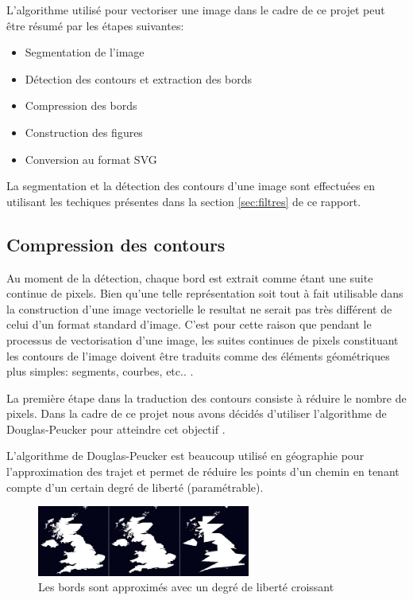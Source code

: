 \documentclass[twoside,openright,a4paper,11pt,french]{article}
\begin{document}
L'algorithme utilisé pour vectoriser une image dans le cadre de ce projet peut
être résumé par les étapes suivantes:   

\smallbreak
\begin{itemize}
\item Segmentation de l'image
\item Détection des contours et extraction des bords
\item Compression des bords
\item Construction des figures
\item Conversion au format SVG
\end{itemize}   
\bigbreak

La segmentation et la détection des contours d'une image sont effectuées
en utilisant les techiques présentes dans la section
\ref{sec:filtres} de ce rapport.


\subsection{Compression des contours}
Au moment de la détection, chaque bord est extrait comme étant une
suite continue de pixels. Bien qu'une telle représentation soit tout à
fait utilisable dans la construction d'une image vectorielle le
resultat ne serait pas très différent de celui d'un format standard
d'image. C'est pour cette raison que pendant le processus de vectorisation d'une
image, les suites continues de pixels constituant les contours de
l'image doivent être traduits comme des éléments géométriques plus
simples: segments, courbes, etc.. .  

La première étape dans la traduction des contours consiste à réduire
le nombre de pixels. Dans la cadre de ce projet nous avons décidés d'utiliser
l'algorithme de Douglas-Peucker pour atteindre cet objectif
\cite{url-dougpeuck}.

L'algorithme de Douglas-Peucker est beaucoup utilisé en géographie pour
l'approximation des trajet et permet de réduire les points d'un chemin en
tenant compte d'un certain degré de liberté (paramétrable).

\begin{figure}[h]
\centering
\includegraphics[width=7cm]{./pics/dp1.eps}
\caption{Les bords sont approximés avec un degré de liberté croissant}
\label{fig:routcidr}
\end{figure}
\end{document}
